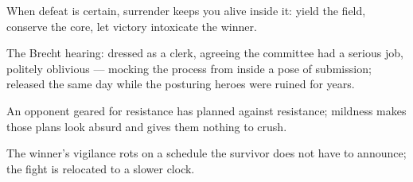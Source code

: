 

\begin{distilled}
  \item When defeat is certain, surrender keeps you alive inside it: yield the field, conserve the core, let victory intoxicate the winner.
  \item The Brecht hearing: dressed as a clerk, agreeing the committee had a serious job, politely oblivious --- mocking the process from inside a pose of submission; released the same day while the posturing heroes were ruined for years.
  \item An opponent geared for resistance has planned against resistance; mildness makes those plans look absurd and gives them nothing to crush.
  \item The winner's vigilance rots on a schedule the survivor does not have to announce; the fight is relocated to a slower clock.
\end{distilled}
